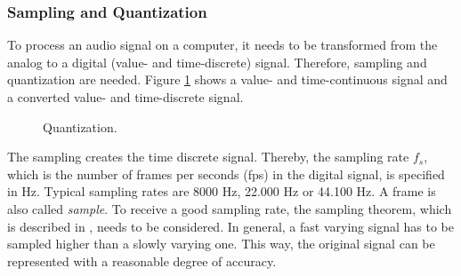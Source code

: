 \subsubsection{Sampling and Quantization}

To process an audio signal on a computer, it needs to be transformed from the analog to a digital (value- and time-discrete) signal. Therefore, sampling and quantization are needed. Figure \ref{fig:quantization} shows a value- and time-continuous signal and a converted value- and time-discrete signal.

\begin{figure}[ht]
	\centering
	\caption{
		Quantization.
	}
	\label{fig:quantization}
\end{figure}

The sampling creates the time discrete signal. Thereby, the sampling rate $f_s$, which is the number of frames per seconds (fps) in the digital signal, is specified in Hz. Typical sampling rates are 8000 Hz, 22.000 Hz or 44.100 Hz. A frame is also called \textit{sample}. To receive a good sampling rate, the sampling theorem, which is described in \autocite{Zoelzer:2008}, needs to be considered. In general, a fast varying signal has to be sampled higher than a slowly varying one. This way, the original signal can be represented with a reasonable degree of accuracy.

